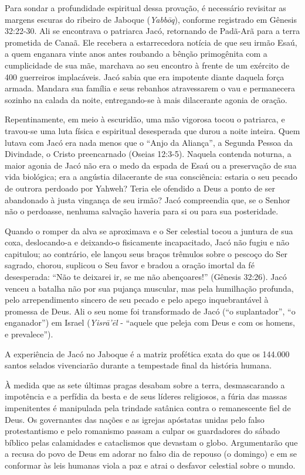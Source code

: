 \documentclass[11pt,a4paper,openany]{book}
\begin{document}
Para sondar a profundidade espiritual dessa provação, é necessário revisitar as margens escuras do ribeiro de Jaboque (\textit{Yabbōq}), conforme registrado em Gênesis 32:22-30. Ali se encontrava o patriarca Jacó, retornando de Padã-Arã para a terra prometida de Canaã. Ele recebera a estarrecedora notícia de que seu irmão Esaú, a quem enganara vinte anos antes roubando a bênção primogênita com a cumplicidade de sua mãe, marchava ao seu encontro à frente de um exército de 400 guerreiros implacáveis. Jacó sabia que era impotente diante daquela força armada. Mandara sua família e seus rebanhos atravessarem o vau e permanecera sozinho na calada da noite, entregando-se à mais dilacerante agonia de oração.

Repentinamente, em meio à escuridão, uma mão vigorosa tocou o patriarca, e travou-se uma luta física e espiritual desesperada que durou a noite inteira. Quem lutava com Jacó era nada menos que o ``Anjo da Aliança'', a Segunda Pessoa da Divindade, o Cristo preencarnado (Oseias 12:3-5). Naquela contenda noturna, a maior agonia de Jacó não era o medo da espada de Esaú ou a preservação de sua vida biológica; era a angústia dilacerante de sua consciência: estaria o seu pecado de outrora perdoado por Yahweh? Teria ele ofendido a Deus a ponto de ser abandonado à justa vingança de seu irmão? Jacó compreendia que, se o Senhor não o perdoasse, nenhuma salvação haveria para si ou para sua posteridade.

Quando o romper da alva se aproximava e o Ser celestial tocou a juntura de sua coxa, deslocando-a e deixando-o fisicamente incapacitado, Jacó não fugiu e não capitulou; ao contrário, ele lançou seus braços trêmulos sobre o pescoço do Ser sagrado, chorou, suplicou o Seu favor e bradou a oração imortal da fé desesperada: ``Não te deixarei ir, se me não abençoares!'' (Gênesis 32:26). Jacó venceu a batalha não por sua pujança muscular, mas pela humilhação profunda, pelo arrependimento sincero de seu pecado e pelo apego inquebrantável à promessa de Deus. Ali o seu nome foi transformado de Jacó (``o suplantador'', ``o enganador'') em Israel (\textit{Yisrā’ēl} - ``aquele que peleja com Deus e com os homens, e prevalece'').

A experiência de Jacó no Jaboque é a matriz profética exata do que os 144.000 santos selados vivenciarão durante a tempestade final da história humana.

À medida que as sete últimas pragas desabam sobre a terra, desmascarando a impotência e a perfídia da besta e de seus líderes religiosos, a fúria das massas impenitentes é manipulada pela trindade satânica contra o remanescente fiel de Deus. Os governantes das nações e as igrejas apóstatas unidas pelo falso protestantismo e pelo romanismo passam a culpar os guardadores do sábado bíblico pelas calamidades e cataclismos que devastam o globo. Argumentarão que a recusa do povo de Deus em adorar no falso dia de repouso (o domingo) e em se conformar às leis humanas viola a paz e atrai o desfavor celestial sobre o mundo.
\end{document}
